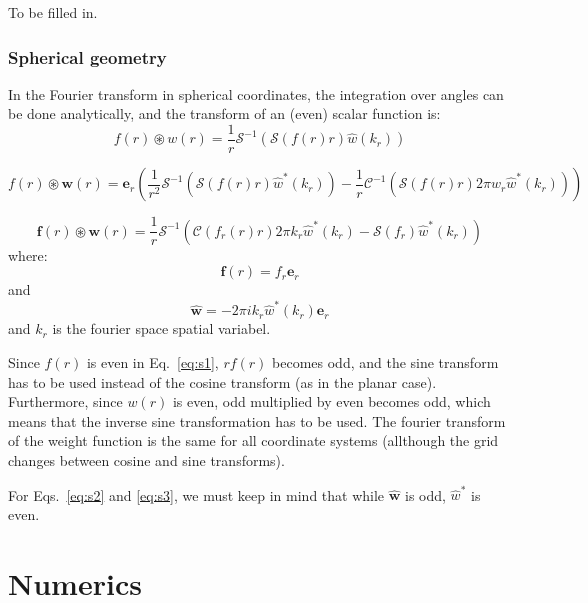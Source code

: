 \documentclass[12pt, letterpaper]{article}
\begin{document}
To be filled in.

\subsubsection{Spherical geometry}
In the Fourier transform in spherical coordinates, the integration over angles can be done analytically, and the transform of an (even) scalar function is:
\begin{equation}
  f(r)\circledast w(r) = \frac{1}{r}\mathscr{S}^{-1}\left(\mathscr{S}\left(f(r)r\right)\hat{w}(k_r)\right)
  \label{eq:s1}
\end{equation}

\begin{equation}
  f(r)\circledast \mathbf{w}(r) = \mathbf{e}_r\left(\frac{1}{r^2}\mathscr{S}^{-1}\left(\mathscr{S}\left(f(r)r\right)\hat{w}^*(k_r)\right)-\frac{1}{r}\mathscr{C}^{-1}\left(\mathscr{S}\left(f(r)r\right)2\pi w_r\hat{w}^*(k_r)\right)\right)
   \label{eq:s2}
\end{equation}

\begin{equation}
  \mathbf{f}(r)\circledast \mathbf{w}(r) = \frac{1}{r}\mathscr{S}^{-1}\left(\mathscr{C}\left(f_r(r)r\right)2\pi k_r\hat{w}^*(k_r)-\mathscr{S}\left(f_r\right)\hat{w}^*(k_r)\right)
   \label{eq:s3}
\end{equation}
where:
\begin{equation}
\mathbf{f}(r)=f_r\mathbf{e}_r
\end{equation}
and
\begin{equation}
\hat{\mathbf{w}}=-2\pi i k_r\hat{w}^*(k_r)\mathbf{e}_r
\end{equation}
and $k_r$ is the fourier space spatial variabel.

Since $f(r)$ is even in Eq.~\ref{eq:s1}, $rf(r)$ becomes odd, and the sine transform has to be used instead of the cosine transform (as in the planar case). Furthermore, since $w(r)$ is even, odd multiplied by even becomes odd, which means that the inverse sine transformation has to be used. The fourier transform of the weight function is the same for all coordinate systems (allthough the grid changes between cosine and sine transforms).

For Eqs.~\ref{eq:s2} and \ref{eq:s3}, we must keep in mind that while $\hat{\mathbf{w}}$ is odd, $\hat{w}^*$ is even. 


\section{Numerics}
\end{document}
